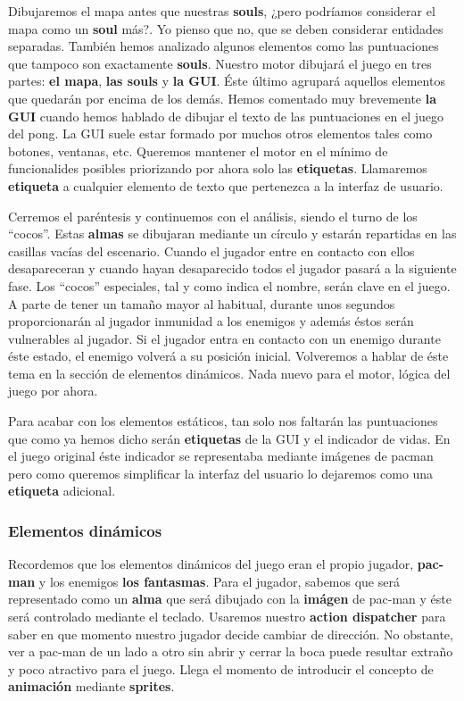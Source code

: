 \documentclass[a4paper]{article}
\begin{document}
Dibujaremos el mapa antes que nuestras \textbf{souls}, ¿pero podríamos considerar el mapa como un \textbf{soul} más?. Yo pienso que no, que se deben considerar entidades separadas. También hemos analizado algunos elementos como las puntuaciones que tampoco son exactamente \textbf{souls}. Nuestro motor dibujará el juego en tres partes: \textbf{el mapa}, \textbf{las souls} y \textbf{la GUI}. Éste último agrupará aquellos elementos que quedarán por encima de los demás. Hemos comentado muy brevemente \textbf{la GUI} cuando hemos hablado de dibujar el texto de las puntuaciones en el juego del pong. La GUI suele estar formado por muchos otros elementos tales como botones, ventanas, etc. Queremos mantener el motor en el mínimo de funcionalides posibles priorizando por ahora solo las \textbf{etiquetas}. Llamaremos \textbf{etiqueta} a cualquier elemento de texto que pertenezca a la interfaz de usuario.

Cerremos el paréntesis y continuemos con el análisis, siendo el turno de los ``cocos''. Estas \textbf{almas} se dibujaran mediante un círculo y estarán repartidas en las casillas vacías del escenario. Cuando el jugador entre en contacto con ellos desapareceran y cuando hayan desaparecido todos el jugador pasará a la siguiente fase. Los ``cocos'' especiales, tal y como indica el nombre, serán clave en el juego. A parte de tener un tamaño mayor al habitual, durante unos segundos proporcionarán al jugador inmunidad a los enemigos y además éstos serán vulnerables al jugador. Si el jugador entra en contacto con un enemigo durante éste estado, el enemigo volverá a su posición inicial. Volveremos a hablar de éste tema en la sección de elementos dinámicos. Nada nuevo para el motor, lógica del juego por ahora.

Para acabar con los elementos estáticos, tan solo nos faltarán las puntuaciones que como ya hemos dicho serán \textbf{etiquetas} de la GUI y el indicador de vidas. En el juego original éste indicador se representaba mediante imágenes de pacman pero como queremos simplificar la interfaz del usuario lo dejaremos como una \textbf{etiqueta} adicional.

\subsubsection{Elementos dinámicos}

Recordemos que los elementos dinámicos del juego eran el propio jugador, \textbf{pac-man} y los enemigos \textbf{los fantasmas}. Para el jugador, sabemos que será representado como un \textbf{alma} que será dibujado con la \textbf{imágen} de pac-man y éste será controlado mediante el teclado. Usaremos nuestro \textbf{action dispatcher} para saber en que momento nuestro jugador decide cambiar de dirección. No obstante, ver a pac-man de un lado a otro sin abrir y cerrar la boca puede resultar extraño y poco atractivo para el juego. Llega el momento de introducir el concepto de \textbf{animación} mediante \textbf{sprites}.
\end{document}
